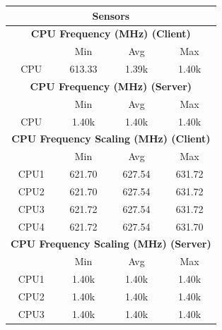 \documentclass[11pt,a4paper,headinclude=false,footinclude=false]{scrreprt}
\begin{document}
\begin{table}[H]
\centering
    \begin{tabular}{||c|c|c|c|c|c|c||}
    \hline
    \multicolumn{7}{|c|}{\textbf{Sensors}} \\
    \hline
    \multicolumn{7}{|c|}{\textbf{CPU Frequency (MHz) (Client)}} \\
    \hline\hline
      & \multicolumn{2}{|c|}{Min} & \multicolumn{2}{|c|}{Avg} & \multicolumn{2}{|c|}{Max} \\
    \hline
    CPU & \multicolumn{2}{|c|}{613.33} & \multicolumn{2}{|c|}{1.39k} & \multicolumn{2}{|c|}{1.40k} \\
    \hline\hline
    \multicolumn{7}{|c|}{\textbf{CPU Frequency (MHz) (Server)}} \\
    \hline\hline
      & \multicolumn{2}{|c|}{Min} & \multicolumn{2}{|c|}{Avg} & \multicolumn{2}{|c|}{Max} \\
    \hline
    CPU & \multicolumn{2}{|c|}{1.40k} & \multicolumn{2}{|c|}{1.40k} & \multicolumn{2}{|c|}{1.40k} \\
    \hline\hline
    \multicolumn{7}{|c|}{\textbf{CPU Frequency Scaling (MHz) (Client)}} \\
    \hline
      & \multicolumn{2}{|c|}{Min} & \multicolumn{2}{|c|}{Avg} & \multicolumn{2}{|c|}{Max} \\
    \hline
    CPU1 & \multicolumn{2}{|c|}{621.70} & \multicolumn{2}{|c|}{627.54} & \multicolumn{2}{|c|}{631.72} \\
    \hline
    CPU2 & \multicolumn{2}{|c|}{621.70} & \multicolumn{2}{|c|}{627.54} & \multicolumn{2}{|c|}{631.72} \\
    \hline
    CPU3 & \multicolumn{2}{|c|}{621.72} & \multicolumn{2}{|c|}{627.54} & \multicolumn{2}{|c|}{631.72} \\
    \hline
    CPU4 & \multicolumn{2}{|c|}{621.72} & \multicolumn{2}{|c|}{627.54} & \multicolumn{2}{|c|}{631.70} \\
    \hline\hline
    \multicolumn{7}{|c|}{\textbf{CPU Frequency Scaling (MHz) (Server)}} \\
    \hline
      & \multicolumn{2}{|c|}{Min} & \multicolumn{2}{|c|}{Avg} & \multicolumn{2}{|c|}{Max} \\
    \hline
    CPU1 & \multicolumn{2}{|c|}{1.40k} & \multicolumn{2}{|c|}{1.40k} & \multicolumn{2}{|c|}{1.40k} \\
    \hline
    CPU2 & \multicolumn{2}{|c|}{1.40k} & \multicolumn{2}{|c|}{1.40k} & \multicolumn{2}{|c|}{1.40k} \\
    \hline
    CPU3 & \multicolumn{2}{|c|}{1.40k} & \multicolumn{2}{|c|}{1.40k} & \multicolumn{2}{|c|}{1.40k} \\

\end{tabular}
\end{table}
\end{document}
